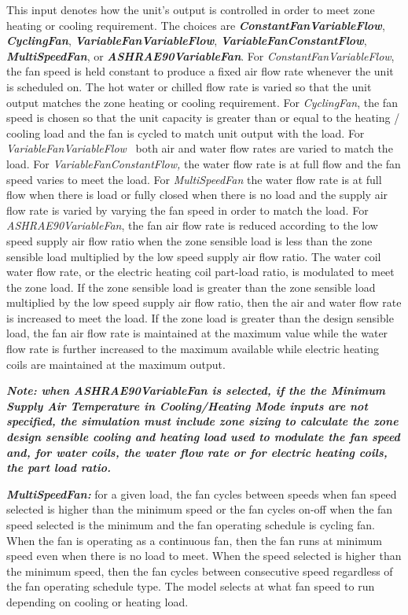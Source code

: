 This input denotes how the unit's output is controlled in order to meet zone heating or cooling requirement. The choices are \textbf{\emph{ConstantFanVariableFlow}}, \textbf{\emph{CyclingFan}}, \textbf{\emph{VariableFanVariableFlow}}, \textbf{\emph{VariableFanConstantFlow}}, \textbf{\emph{MultiSpeedFan}}, or \textbf{\emph{ASHRAE90VariableFan}}. For \emph{ConstantFanVariableFlow}, the fan speed is held constant to produce a fixed air flow rate whenever the unit is scheduled on. The hot water or chilled flow rate is varied so that the unit output matches the zone heating or cooling requirement. For \emph{CyclingFan}, the fan speed is chosen so that the unit capacity is greater than or equal to the heating / cooling load and the fan is cycled to match unit output with the load. For \emph{VariableFanVariableFlow} ~both air and water flow rates are varied to match the load. For \emph{VariableFanConstantFlow,} the water flow rate is at full flow and the fan speed varies to meet the load. For \emph{MultiSpeedFan} the water flow rate is at full flow when there is load or fully closed when there is no load and the supply air flow rate is varied by varying the fan speed in order to match the load. For \emph{ASHRAE90VariableFan}, the fan air flow rate is reduced according to the low speed supply air flow ratio when the zone sensible load is less than the zone sensible load multiplied by the low speed supply air flow ratio. The water coil water flow rate, or the electric heating coil part-load ratio, is modulated to meet the zone load. If the zone sensible load is greater than the zone sensible load multiplied by the low speed supply air flow ratio, then the air and water flow rate is increased to meet the load. If the zone load is greater than the design sensible load, the fan air flow rate is maintained at the maximum value while the water flow rate is further increased to the maximum available while electric heating coils are maintained at the maximum output.

\textbf{\emph{Note: when ASHRAE90VariableFan is selected, if the the Minimum Supply Air Temperature in Cooling/Heating Mode inputs are not specified, the simulation must include zone sizing to calculate the zone design sensible cooling and heating load used to modulate the fan speed and, for water coils, the water flow rate or for electric heating coils, the part load ratio.}}

\textbf{\emph{MultiSpeedFan:}} for a given load, the fan cycles between speeds when fan speed selected is higher than the minimum speed or the fan cycles on-off when the fan speed selected is the minimum and the fan operating schedule is cycling fan. When the fan is operating as a continuous fan, then the fan runs at minimum speed even when there is no load to meet. When the speed selected is higher than the minimum speed, then the fan cycles between consecutive speed regardless of the fan operating schedule type. The model selects at what fan speed to run depending on cooling or heating load.

